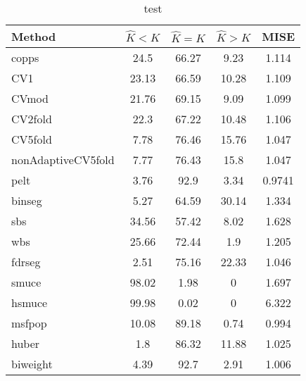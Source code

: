 \begin{table}[ht]
\centering
\begin{tabular}{l|cccc}
  \hline
Method & $\hat{K} < K$ & $\hat{K} = K$ & $\hat{K} > K$ & MISE \\ 
  \hline
copps &  24.5 & 66.27 &  9.23 & 1.114 \\ 
  CV1 & 23.13 & 66.59 & 10.28 & 1.109 \\ 
  CVmod & 21.76 & 69.15 &  9.09 & 1.099 \\ 
  CV2fold &  22.3 & 67.22 & 10.48 & 1.106 \\ 
  CV5fold &  7.78 & 76.46 & 15.76 & 1.047 \\ 
  nonAdaptiveCV5fold &  7.77 & 76.43 &  15.8 & 1.047 \\ 
  pelt &  3.76 &  92.9 &  3.34 & 0.9741 \\ 
  binseg &  5.27 & 64.59 & 30.14 & 1.334 \\ 
  sbs & 34.56 & 57.42 &  8.02 & 1.628 \\ 
  wbs & 25.66 & 72.44 &   1.9 & 1.205 \\ 
  fdrseg &  2.51 & 75.16 & 22.33 & 1.046 \\ 
  smuce & 98.02 &  1.98 &     0 & 1.697 \\ 
  hsmuce & 99.98 &  0.02 &     0 & 6.322 \\ 
  msfpop & 10.08 & 89.18 &  0.74 & 0.994 \\ 
  huber &   1.8 & 86.32 & 11.88 & 1.025 \\ 
  biweight &  4.39 &  92.7 &  2.91 & 1.006 \\ 
   \hline
\end{tabular}
\caption{test} 
\end{table}
